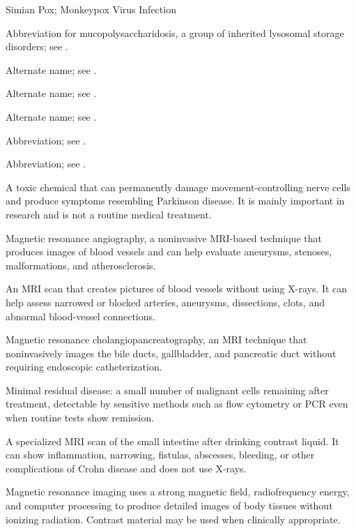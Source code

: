 \synonyms
Simian Pox; Monkeypox Virus Infection

 Abbreviation for mucopolysaccharidosis, a group of inherited lysosomal storage disorders; see .

 Alternate name; see .

 Alternate name; see .

 Alternate name; see .

 Abbreviation; see .

 Abbreviation; see .

 A toxic chemical that can permanently damage movement-controlling nerve cells and produce symptoms resembling Parkinson disease. It is mainly important in research and is not a routine medical treatment.

 Magnetic resonance angiography, a noninvasive MRI-based technique that produces images of blood vessels and can help evaluate aneurysms, stenoses, malformations, and atherosclerosis.

 An MRI scan that creates pictures of blood vessels without using X-rays. It can help assess narrowed or blocked arteries, aneurysms, dissections, clots, and abnormal blood-vessel connections.

 Magnetic resonance cholangiopancreatography, an MRI technique that noninvasively images the bile ducts, gallbladder, and pancreatic duct without requiring endoscopic catheterization.

 Minimal residual disease: a small number of malignant cells remaining after treatment, detectable by sensitive methods such as flow cytometry or PCR even when routine tests show remission.

 A specialized MRI scan of the small intestine after drinking contrast liquid. It can show inflammation, narrowing, fistulas, abscesses, bleeding, or other complications of Crohn disease and does not use X-rays.

 Magnetic resonance imaging uses a strong magnetic field, radiofrequency energy, and computer processing to produce detailed images of body tissues without ionizing radiation. Contrast material may be used when clinically appropriate.


